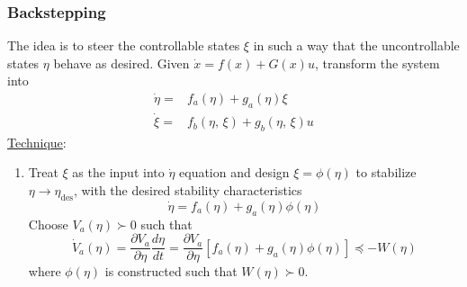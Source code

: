 \documentclass[twocolumn]{article}    %
\begin{document}
\subsubsection*{Backstepping}
The idea is to steer the controllable states \(\xi\) in such a way that the uncontrollable states \(\eta\) behave as desired. Given \(\dot{x} = f(x) + G(x)u\), transform the system into 
\begin{align*}
    \dot{\eta} =& f_a(\eta) + g_a(\eta)\xi\\
    \dot{\xi} =& f_b(\eta,\,\xi) + g_b(\eta,\,\xi)u
\end{align*}
\underline{Technique}:
\begin{enumerate}
    \item Treat \(\xi\) as the input into \(\dot{\eta}\) equation and design \(\xi = \phi(\eta)\) to stabilize \(\eta \to \eta_{\text{des}}\), with the desired stability characteristics
    \begin{equation*}
        \dot{\eta} = f_a(\eta) + g_a(\eta)\phi(\eta)
    \end{equation*}
    Choose \(V_a(\eta) \succ 0\) such that
    \begin{equation*}
        \dot{V}_a(\eta) = \frac{\partial V_a}{\partial \eta} \frac{d \eta}{dt} =  \frac{\partial V_a}{\partial \eta} \left[f_a(\eta) + g_a(\eta)\phi(\eta) \right] \preceq -W(\eta)
    \end{equation*}
    where \(\phi(\eta)\) is constructed such that \(W(\eta) \succ 0\).
    

\end{enumerate}
\end{document}
